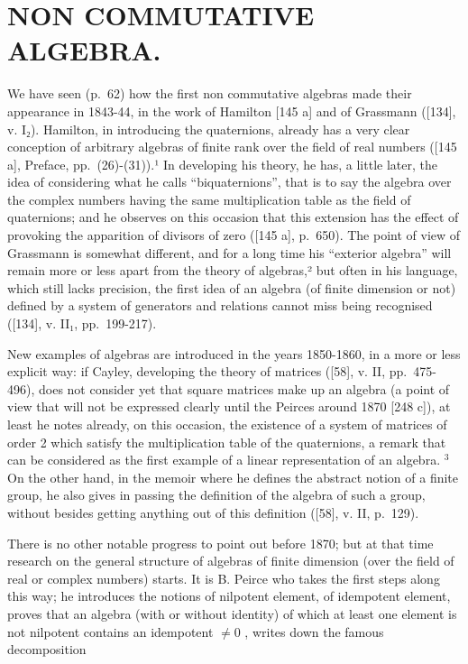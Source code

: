 \chapter{NON COMMUTATIVE ALGEBRA.}

We have seen (p.~62) how the first non commutative algebras made their appearance in 1843-44, in the work of Hamilton {[}145 a{]} and of Grassmann ({[}134{]}, v. I₂). Hamilton, in introducing the quaternions, already has a very clear conception of arbitrary algebras of finite rank over the field of real numbers ({[}145 a{]}, Preface, pp.~(26)-(31)).¹ In developing his theory, he has, a little later, the idea of considering what he calls ``biquaternions'', that is to say the algebra over the complex numbers having the same multiplication table as the field of quaternions; and he observes on this occasion that this extension has the effect of provoking the apparition of divisors of zero ({[}145 a{]}, p.~650). The point of view of Grassmann is somewhat different, and for a long time his ``exterior algebra'' will remain more or less apart from the theory of algebras,² but often in his language, which still lacks precision, the first idea of an algebra (of finite dimension or not) defined by a system of generators and relations cannot miss being recognised ({[}134{]}, v. II₁, pp.~199-217).

New examples of algebras are introduced in the years 1850-1860, in a more or less explicit way: if Cayley, developing the theory of matrices ({[}58{]}, v. II, pp.~475-496), does not consider yet that square matrices make up an algebra (a point of view that will not be expressed clearly until the Peirces around 1870 {[}248 c{]}), at least he notes already, on this occasion, the existence of a system of matrices of order 2 which satisfy the multiplication table of the quaternions, a remark that can be considered as the first example of a linear representation of an algebra. \(^{3}\) On the other hand, in the memoir where he defines the abstract notion of a finite group, he also gives in passing the definition of the algebra of such a group, without besides getting anything out of this definition ({[}58{]}, v. II, p.~129).

There is no other notable progress to point out before 1870; but at that time research on the general structure of algebras of finite dimension (over the field of real or complex numbers) starts. It is B. Peirce who takes the first steps along this way; he introduces the notions of nilpotent element, of idempotent element, proves that an algebra (with or without identity) of which at least one element is not nilpotent contains an idempotent \(\neq 0\) , writes down the famous decomposition

